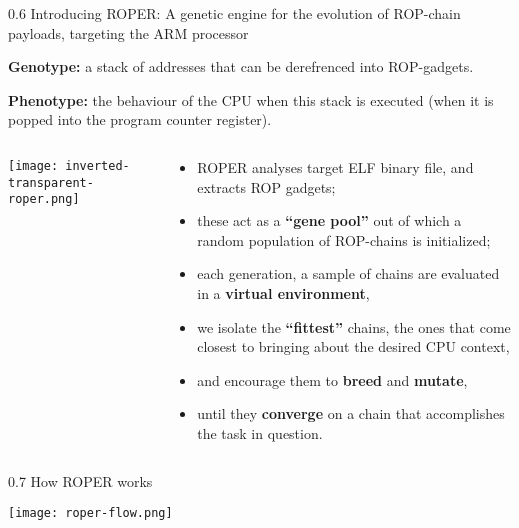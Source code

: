 \documentclass[9pt]{beamer}
\begin{document}
\begin{frame}{0.6 Introducing ROPER: A genetic engine for the evolution of ROP-chain payloads, targeting the ARM processor}

\textbf{Genotype:} a stack of addresses that can be derefrenced into ROP-gadgets. 
\vspace{10pt}

\textbf{Phenotype:} the behaviour of the CPU when this stack is executed (when it is popped into the program counter register).

\begin{columns}

    \begin{column}{0.3\textwidth}
    \texttt{[image: inverted-transparent-roper.png]}
    \end{column}
    \begin{column}{0.7\textwidth}
    
    \begin{itemize}
    \item ROPER analyses target ELF binary file, and extracts ROP gadgets;
    \item these act as a \textbf{``gene pool''} out of which a random population of ROP-chains is initialized;
    \item each generation, a sample of chains are evaluated in a \textbf{virtual environment},
    \item we isolate the \textbf{``fittest''} chains, the ones that come closest to bringing about the desired CPU context,
    \item and encourage them to \textbf{breed} and \textbf{mutate},
    \item until they \textbf{converge} on a chain that accomplishes the task in question.
    \end{itemize}
    
    \end{column}
\end{columns}
\end{frame}

\begin{frame}{0.7 How ROPER works}


\texttt{[image: roper-flow.png]} 


\end{frame}
\end{document}
